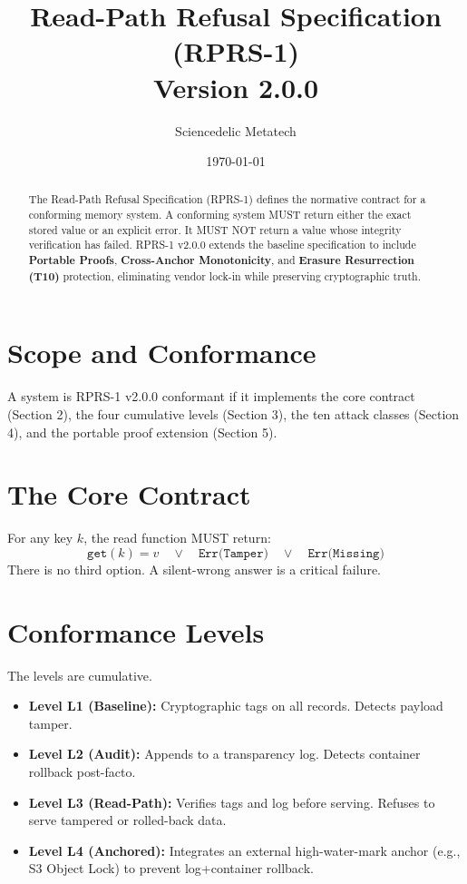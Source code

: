 \documentclass[11pt, a4paper]{article}
\title{\textbf{Read-Path Refusal Specification (RPRS-1)}\\ Version 2.0.0}
\author{Sciencedelic Metatech}
\date{\today}
\begin{document}
\maketitle

\begin{abstract}
The Read-Path Refusal Specification (RPRS-1) defines the normative contract for a conforming memory system. A conforming system MUST return either the exact stored value or an explicit error. It MUST NOT return a value whose integrity verification has failed. RPRS-1 v2.0.0 extends the baseline specification to include \textbf{Portable Proofs}, \textbf{Cross-Anchor Monotonicity}, and \textbf{Erasure Resurrection (T10)} protection, eliminating vendor lock-in while preserving cryptographic truth.
\end{abstract}

\section{Scope and Conformance}
A system is RPRS-1 v2.0.0 conformant if it implements the core contract (Section 2), the four cumulative levels (Section 3), the ten attack classes (Section 4), and the portable proof extension (Section 5).

\section{The Core Contract}
For any key \(k\), the read function MUST return:
\begin{equation}
    \texttt{get}(k) = v \quad \lor \quad \texttt{Err(Tamper)} \quad \lor \quad \texttt{Err(Missing)}
\end{equation}
There is no third option. A silent-wrong answer is a critical failure.

\section{Conformance Levels}
The levels are cumulative.
\begin{itemize}
    \item \textbf{Level L1 (Baseline):} Cryptographic tags on all records. Detects payload tamper.
    \item \textbf{Level L2 (Audit):} Appends to a transparency log. Detects container rollback post-facto.
    \item \textbf{Level L3 (Read-Path):} Verifies tags and log before serving. Refuses to serve tampered or rolled-back data.
    \item \textbf{Level L4 (Anchored):} Integrates an external high-water-mark anchor (e.g., S3 Object Lock) to prevent log+container rollback.
\end{itemize}
\end{document}

